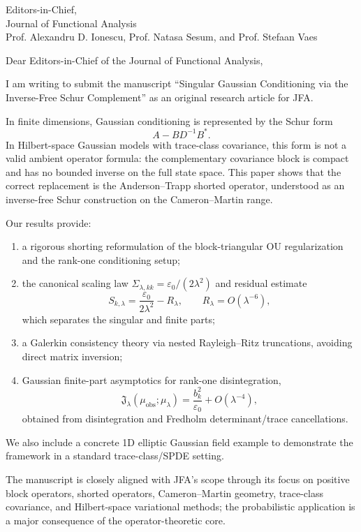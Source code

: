 \documentclass[11pt]{letter}
\begin{document}
\begin{letter}{Editors-in-Chief, \\ Journal of Functional Analysis\\
Prof. Alexandru D. Ionescu, Prof. Natasa Sesum, and Prof. Stefaan Vaes}
\date{2026-06-11}
\opening{Dear Editors-in-Chief of the Journal of Functional Analysis,}

I am writing to submit the manuscript ``Singular Gaussian Conditioning via the Inverse-Free Schur Complement'' as an original research article for JFA.

In finite dimensions, Gaussian conditioning is represented by the Schur form
\[
A - B D^{-1} B^*.
\]
In Hilbert-space Gaussian models with trace-class covariance, this form is not a valid ambient operator formula: the complementary covariance block is compact and has no bounded inverse on the full state space. This paper shows that the correct replacement is the Anderson--Trapp shorted operator, understood as an inverse-free Schur construction on the Cameron--Martin range.

Our results provide:
\begin{enumerate}
  \item a rigorous shorting reformulation of the block-triangular OU regularization and the rank-one conditioning setup;
  \item the canonical scaling law $\Sigma_{\lambda,kk}=\varepsilon_0/(2\lambda^2)$ and residual estimate
  \[
  S_{k,\lambda}=\frac{\varepsilon_0}{2\lambda^2}-R_\lambda,\qquad R_\lambda=O(\lambda^{-6}),
  \]
  which separates the singular and finite parts;
  \item a Galerkin consistency theory via nested Rayleigh--Ritz truncations, avoiding direct matrix inversion;
  \item Gaussian finite-part asymptotics for rank-one disintegration,
  \[
  \mathfrak{J}_\lambda(\mu_{\mathrm{obs}};\mu_\lambda)=\frac{b_k^2}{\varepsilon_0}+O(\lambda^{-4}),
  \]
  obtained from disintegration and Fredholm determinant/trace cancellations.
\end{enumerate}

We also include a concrete 1D elliptic Gaussian field example to demonstrate the framework in a standard trace-class/SPDE setting.

The manuscript is closely aligned with JFA’s scope through its focus on positive block operators, shorted operators, Cameron--Martin geometry, trace-class covariance, and Hilbert-space variational methods; the probabilistic application is a major consequence of the operator-theoretic core.


\end{letter}
\end{document}
